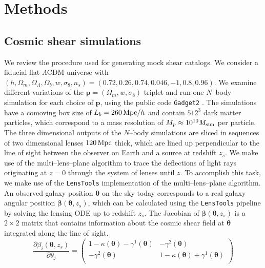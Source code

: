 \documentclass[reprint,aps,prd,superscriptaddress,showkeys,showpacs]{revtex4-1}
\newcommand{\bb}[1]{\mathbf{#1}}
\newcommand{\ttt}[1]{\texttt{#1}}
\begin{document}

\section{Methods}

\subsection{Cosmic shear simulations}
\label{sec:shearsim}
We review the procedure used for generating mock shear catalogs. We consider a fiducial flat $\Lambda$CDM universe with $(h,\Omega_m,\Omega_\Lambda,\Omega_b,w,\sigma_8,n_s)=(0.72,0.26,0.74,0.046,-1,0.8,0.96)$. We examine different variations of the $\bb{p}=(\Omega_m,w,\sigma_8)$ triplet and run one $N$--body simulation for each choice of $\bb{p}$, using the public code \ttt{Gadget2} \citep{Gadget2}. The simulations have a comoving box size of $L_b=260\,{\rm Mpc}/h$ and contain $512^3$ dark matter particles, which correspond to a mass resolution of $M_p\approx 10^{10}M_{\rm sun}$ per particle. The three dimensional outputs of the $N$--body simulations are sliced in sequences of two dimensional lenses $120 \,{\rm Mpc}$ thick, which are lined up perpendicular to the line of sight between the observer on Earth and a source at redshift $z_s$. We make use of the multi--lens--plane algorithm \citep{RayTracingJain,RayTracingHartlap} to trace the deflections of light rays originating at $z=0$ through the system of lenses until $z$. To accomplish this task, we make use of the \ttt{LensTools} \citep{LensTools-ASCL,LensTools-paper} implementation of the multi--lens--plane algorithm. An observed galaxy position $\pmb{\theta}$ on the sky today corresponds to a real galaxy angular position $\pmb{\beta}(\pmb{\theta},z_s)$, which can be calculated using the \ttt{LensTools} pipeline by solving the lensing ODE up to redshift $z_s$. The Jacobian of $\pmb{\beta}(\pmb{\theta},z_s)$ is a $2\times 2$ matrix that contains information about the cosmic shear field at $\pmb{\theta}$ integrated along the line of sight. 
%
\begin{equation}
\label{meth:sheareqn}
\frac{\partial\beta_i(\pmb{\theta},z_s)}{\partial \theta_j} = 
\begin{pmatrix}
1-\kappa(\pmb{\theta})-\gamma^1(\pmb{\theta}) & -\gamma^2(\pmb{\theta}) \\
-\gamma^2(\pmb{\theta}) & 1-\kappa(\pmb{\theta})+\gamma^1(\pmb{\theta})\\
\end{pmatrix}
\end{equation}  
\end{document}
